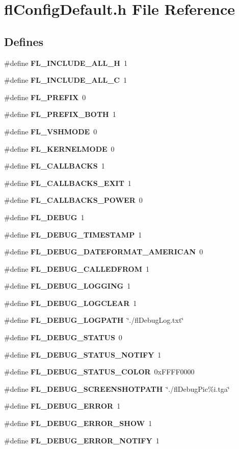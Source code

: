 \section{fl\-Config\-Default.h File Reference}
\label{flConfigDefault_8h}
\subsection*{Defines}
\begin{CompactItemize}
\item 
\#define {\bf FL\_\-INCLUDE\_\-ALL\_\-H}~1
\item 
\#define {\bf FL\_\-INCLUDE\_\-ALL\_\-C}~1
\item 
\#define {\bf FL\_\-PREFIX}~0
\item 
\#define {\bf FL\_\-PREFIX\_\-BOTH}~1
\item 
\#define {\bf FL\_\-VSHMODE}~0
\item 
\#define {\bf FL\_\-KERNELMODE}~0
\item 
\#define {\bf FL\_\-CALLBACKS}~1
\item 
\#define {\bf FL\_\-CALLBACKS\_\-EXIT}~1
\item 
\#define {\bf FL\_\-CALLBACKS\_\-POWER}~0
\item 
\#define {\bf FL\_\-DEBUG}~1
\item 
\#define {\bf FL\_\-DEBUG\_\-TIMESTAMP}~1
\item 
\#define {\bf FL\_\-DEBUG\_\-DATEFORMAT\_\-AMERICAN}~0
\item 
\#define {\bf FL\_\-DEBUG\_\-CALLEDFROM}~1
\item 
\#define {\bf FL\_\-DEBUG\_\-LOGGING}~1
\item 
\#define {\bf FL\_\-DEBUG\_\-LOGCLEAR}~1
\item 
\#define {\bf FL\_\-DEBUG\_\-LOGPATH}~\char`\"{}./fl\-Debug\-Log.txt\char`\"{}
\item 
\#define {\bf FL\_\-DEBUG\_\-STATUS}~0
\item 
\#define {\bf FL\_\-DEBUG\_\-STATUS\_\-NOTIFY}~1
\item 
\#define {\bf FL\_\-DEBUG\_\-STATUS\_\-COLOR}~0x\-FFFF0000
\item 
\#define {\bf FL\_\-DEBUG\_\-SCREENSHOTPATH}~\char`\"{}./fl\-Debug\-Pic\%i.tga\char`\"{}
\item 
\#define {\bf FL\_\-DEBUG\_\-ERROR}~1
\item 
\#define {\bf FL\_\-DEBUG\_\-ERROR\_\-SHOW}~1
\item 
\#define {\bf FL\_\-DEBUG\_\-ERROR\_\-NOTIFY}~1

\end{CompactItemize}
